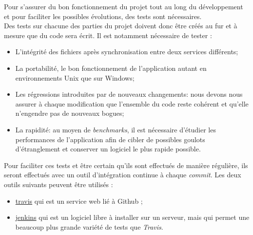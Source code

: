 Pour s'assurer du bon fonctionnement du projet tout au long du développement et pour faciliter les possibles évolutions, des tests sont nécessaires.\\

Des tests sur chacune des parties du projet doivent donc être créés au fur et à mesure que du code sera écrit. Il est notamment nécessaire de tester :\\

\begin{itemize}
\renewcommand{\labelitemi}{$\bullet$}
	\item L'intégrité des fichiers après synchronisation entre deux services différents;
	\item La portabilité, le bon fonctionnement de l'application autant en environnements Unix que sur Windows;
	\item Les régressions introduites par de nouveaux changements: nous devons nous assurer à chaque modification que l'ensemble du code reste cohérent et qu'elle n'engendre pas de nouveaux bogues;
	\item La rapidité: au moyen de \emph{benchmarks}, il est nécessaire d'étudier les performances de l'application afin de cibler de possibles goulots d'étranglement et conserver un logiciel le plus rapide possible.
\end{itemize}

\vspace{0.5cm}

Pour faciliter ces tests et être certain qu'ils sont effectués de manière régulière, ils seront effectués avec un outil d'intégration continue à chaque \textit{commit}. Les deux outils suivants peuvent être utilisés :\\

\begin{itemize}
\renewcommand{\labelitemi}{$\bullet$}
\item \href{https://travis-ci.org}{travis} qui est un service web lié à Github ;
\item \href{http://jenkins-ci.org}{jenkins} qui est un logiciel libre à installer sur un serveur, mais qui permet une beaucoup plus grande variété de tests que \textit{Travis}.
\end{itemize}
